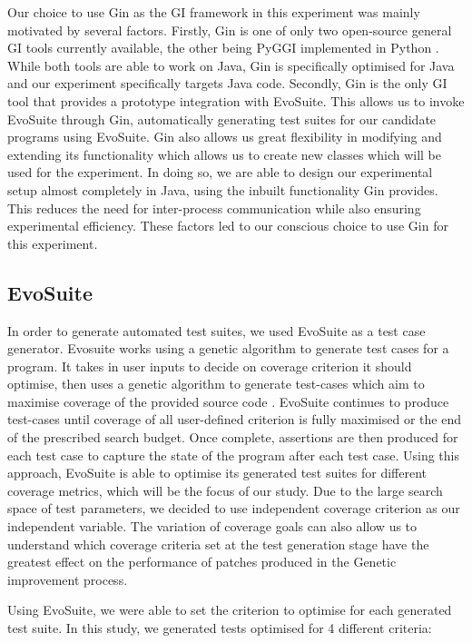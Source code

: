 \documentclass[titlepage]{article}
\begin{document}
Our choice to use Gin as the GI framework in this experiment was mainly motivated by several factors. Firstly, Gin is one of only two open-source general GI tools currently available, the other being PyGGI implemented in Python \cite{pyggi2}. While both tools are able to work on Java, Gin is specifically optimised for Java and our experiment specifically targets Java code. Secondly, Gin is the only GI tool that provides a prototype integration with EvoSuite. This allows us to invoke EvoSuite through Gin, automatically generating test suites for our candidate programs using EvoSuite. Gin also allows us great flexibility in modifying and extending its functionality which allows us to create new  classes which will be used for the experiment. In doing so, we are able to design our experimental setup almost completely in Java, using the inbuilt functionality Gin provides. This reduces the need for inter-process communication while also ensuring experimental efficiency. These factors led to our conscious choice to use Gin for this experiment.


\subsection{EvoSuite}
In order to generate automated test suites, we used EvoSuite as a test case generator. Evosuite works using a genetic algorithm to generate test cases for a program. It takes in user inputs to decide on coverage criterion it should optimise, then uses a genetic algorithm to generate test-cases which aim to maximise coverage of the provided source code \cite{evosuitefaults}. EvoSuite continues to produce test-cases until coverage of all user-defined criterion is fully maximised or the end of the prescribed search budget. Once complete, assertions are then produced for each test case to capture the state of the program after each test case. Using this approach, EvoSuite is able to optimise its generated test suites for different coverage metrics, which will be the focus of our study. Due to the large search space of test parameters, we decided to use independent coverage criterion as our independent variable. The variation of coverage goals can also allow us to understand which coverage criteria set at the test generation stage have the greatest effect on the performance of patches produced in the Genetic improvement process.

Using EvoSuite, we were able to set the criterion to optimise for each generated test suite. In this study, we generated tests optimised for 4 different criteria:
\end{document}
